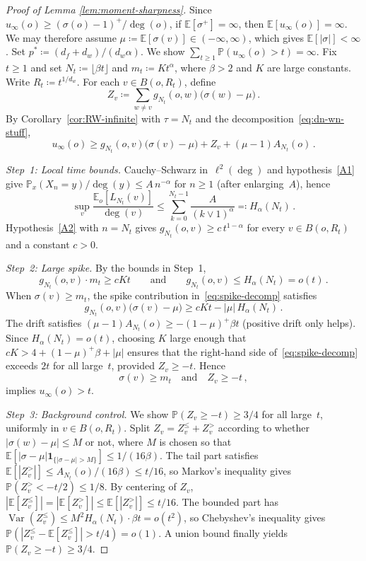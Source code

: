 \documentclass[11pt]{amsart}
\theoremstyle{plain}
\theoremstyle{definition}
\newcommand{\E}{\mathbb{E}}
\renewcommand{\P}{\mathbb{P}}
\newcommand{\one}{\mathbf{1}}
\DeclareMathOperator{\var}{Var}
\begin{document}
	\begin{proof}[Proof of Lemma \ref{lem:moment-sharpness}]
		Since $u_\infty(o)\geq(\sigma(o)-1)^+/\deg(o)$, if $\E[\sigma^+]=\infty$, then $\E[u_\infty(o)]=\infty$. We may therefore assume $\mu\coloneqq\E[\sigma(v)] \in (-\infty, \infty)$, which gives $\E[|\sigma|]<\infty$.  Set $p^*\coloneqq(d_f+d_w)/(d_w\alpha)$.  We show $\sum_{t\geq 1}\P(u_\infty(o)>t)=\infty$. Fix $t\geq 1$ and set $N_t\coloneqq \lfloor \beta t\rfloor$ and $m_t\coloneqq K t^{\alpha}$, where $\beta>2$ and $K$ are large constants.  Write $R_t\coloneqq t^{1/d_w}$.  For each $v\in B(o,R_t)$, define
		\[
		Z_v\coloneqq\sum_{w\neq v}g_{N_t}(o,w)\bigl(\sigma(w)-\mu\bigr)\,.
		\]
		By Corollary~\ref{cor:RW-infinite} with $\tau=N_t$ and the decomposition~\eqref{eq:dn-wn-stuff},
		\begin{equation}\label{eq:spike-decomp}
			u_\infty(o)\geq g_{N_t}(o,v)\bigl(\sigma(v)-\mu\bigr)+Z_v+(\mu-1)A_{N_t}(o)\,.
		\end{equation}
		
		\emph{Step~1: Local time bounds.}  Cauchy--Schwarz in~$\ell^2(\deg)$ and hypothesis~\ref{A1} give $\P_x(X_n=y)/\deg(y)\leq A\,n^{-\alpha}$ for $n\geq 1$ (after enlarging~$A$), hence
		\begin{equation}\label{eq:local-time-ub}
			\sup_v\frac{\E_o[L_{N_t}(v)]}{\deg(v)}\leq\sum_{k=0}^{N_t-1}\frac{A}{(k\vee 1)^{\alpha}}\eqqcolon H_\alpha(N_t)\,.
		\end{equation}
		Hypothesis~\ref{A2} with $n=N_t$ gives $g_{N_t}(o,v)\geq c\,t^{1-\alpha}$ for every $v\in B(o,R_t)$ and a constant $c>0$.
		
		\emph{Step~2: Large spike.}  By the bounds in Step~1,
		\[
		g_{N_t}(o,v)\cdot m_t\geq cKt
		\qquad\text{and}\qquad
		g_{N_t}(o,v)\leq H_\alpha(N_t)=o(t)\,.
		\]
		When $\sigma(v)\geq m_t$, the spike contribution in~\eqref{eq:spike-decomp} satisfies
		\[
		g_{N_t}(o,v)\bigl(\sigma(v)-\mu\bigr)\geq cKt-|\mu|\,H_\alpha(N_t)\,.
		\]
		The drift satisfies $(\mu-1)A_{N_t}(o)\geq -(1-\mu)^+\beta t$ (positive drift only helps).  Since $H_\alpha(N_t)=o(t)$, choosing $K$ large enough that $cK>4+(1-\mu)^+\beta+|\mu|$ ensures that the right-hand side of~\eqref{eq:spike-decomp} exceeds $2t$ for all large~$t$, provided $Z_v\geq -t$.  Hence
		\begin{equation}\label{eq:spike-wins}
			\sigma(v)\geq m_t\quad\text{and}\quad Z_v\geq -t\,,
		\end{equation}
		implies $u_\infty(o)>t$.
		
		\emph{Step~3: Background control.}  We show $\P(Z_v\geq -t)\geq 3/4$ for all large~$t$, uniformly in $v\in B(o,R_t)$.  Split $Z_v=Z_v^{\leq}+Z_v^{>}$ according to whether $|\sigma(w)-\mu|\leq M$ or not, where $M$ is chosen so that $\E[|\sigma-\mu|\one_{\{|\sigma-\mu|>M\}}]\leq 1/(16\beta)$.  The tail part satisfies $\E[|Z_v^{>}|]\leq A_{N_t}(o)/(16\beta)\leq t/16$, so Markov's inequality gives $\P(Z_v^{>}<-t/2)\leq 1/8$.  By centering of $Z_v$, $|\E[Z_v^{\leq}]|=|\E[Z_v^{>}]|\leq\E[|Z_v^{>}|]\leq t/16$. The bounded part has $\var(Z_v^{\leq})\leq M^2 H_\alpha(N_t)\cdot\beta t=o(t^2)$, so Chebyshev's inequality gives $\P(|Z_v^{\leq}-\E[Z_v^{\leq}]|>t/4)=o(1)$.  A union bound finally yields $\P(Z_v\geq -t)\geq 3/4$.
		

\end{proof}
\end{document}
